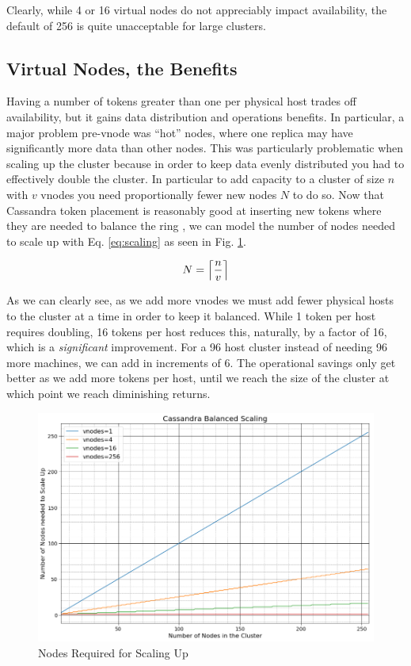 \documentclass{article}
\DeclarePairedDelimiter{\ceil}{\lceil}{\rceil}
\begin{document}
Clearly, while 4 or 16 virtual nodes do not appreciably impact availability,
the default of 256 is quite unacceptable for large clusters.

\subsection{Virtual Nodes, the Benefits}

Having a number of tokens greater than one per physical host trades off
availability, but it gains data distribution and operations benefits. In
particular, a major problem pre-vnode was ``hot'' nodes, where one replica
may have significantly more data than other nodes. This was particularly
problematic when scaling up the cluster because in order to keep data evenly
distributed you had to effectively double the cluster. In particular to add
capacity to a cluster of size $n$ with $v$ vnodes you need proportionally fewer
new nodes $N$ to do so. Now that Cassandra token placement is reasonably good
at inserting new tokens where they are needed to balance the ring
\cite{tokenallocation}, we can model the number of nodes needed to scale up
with Eq. \ref{eq:scaling} as seen in Fig. \ref{fig:scaling}.

\begin{equation} \label{eq:scaling}
    N = \ceil*{\frac{n}{v}}
\end{equation}

As we can clearly see, as we add more vnodes we must add fewer
physical hosts to the cluster at a time in order to keep it balanced. While 1
token per host requires doubling, 16 tokens per host reduces this, naturally,
by a factor of 16, which is a \textit{significant} improvement. For a 96 host
cluster instead of needing 96 more machines, we can add in increments of 6. The
operational savings only get better as we add more tokens per host, until we
reach the size of the cluster at which point we reach diminishing returns.

\begin{figure}[h!]
    \centering
    \includegraphics[width=1.0\textwidth]{images/scale_up.png}
    \caption{Nodes Required for Scaling Up}
    \label{fig:scaling}
\end{figure}
\end{document}
